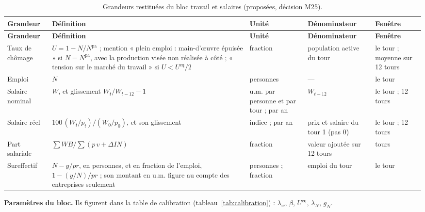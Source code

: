 \documentclass[11pt,a4paper]{article}
\begin{document}
\begin{center}\small
\setlength{\tabcolsep}{4pt}
\begin{longtable}{>{\raggedright\arraybackslash}p{2.3cm}>{\raggedright\arraybackslash}p{5.2cm}>{\raggedright\arraybackslash}p{2.1cm}>{\raggedright\arraybackslash}p{2.6cm}>{\raggedright\arraybackslash}p{2.4cm}}
\caption{Grandeurs restituées du bloc travail et salaires (proposées, décision M25).}\label{tab:travail-restitution}\\
\toprule
\textbf{Grandeur} & \textbf{Définition} & \textbf{Unité} & \textbf{Dénominateur} & \textbf{Fenêtre}\\
\midrule
\endfirsthead
\toprule
\textbf{Grandeur} & \textbf{Définition} & \textbf{Unité} & \textbf{Dénominateur} & \textbf{Fenêtre}\\
\midrule
\endhead
Taux de chômage & $U = 1 - N/N^{\mathrm{pa}}$ ; mention « plein emploi : main-d'œuvre épuisée » si $N = N^{\mathrm{pa}}$, avec la production visée non réalisée à côté ; « tension sur le marché du travail » si $U < U^{\mathrm{eq}}/2$ & fraction & population active du tour & le tour ; moyenne sur 12 tours\\
Emploi & $N$ & personnes & --- & le tour\\
Salaire nominal & $W$, et glissement $W_t/W_{t-12} - 1$ & u.m. par personne et par tour ; par an & $W_{t-12}$ & le tour ; 12 tours\\
Salaire réel & $100\,(W_t/p_t)/(W_0/p_0)$, et son glissement & indice ; par an & prix et salaire du tour 1 (pas 0) & le tour ; 12 tours\\
Part salariale & $\sum \mathit{WB}/\sum (p\,v + \Delta\mathit{IN})$ & fraction & valeur ajoutée sur 12 tours & 12 tours\\
Sureffectif & $N - y/\mathit{pr}$, en personnes, et en fraction de l'emploi, $1 - (y/N)/\mathit{pr}$ ; son montant en u.m. figure au compte des entreprises seulement & personnes ; fraction & emploi du tour & le tour\\
\bottomrule
\end{longtable}
\end{center}

\textbf{Paramètres du bloc.} Ils figurent dans la table de calibration (tableau~\ref{tab:calibration}) : $\lambda_w$, $\beta$, $U^{\mathrm{eq}}$, $\lambda_N$, $g_N$.
\end{document}
